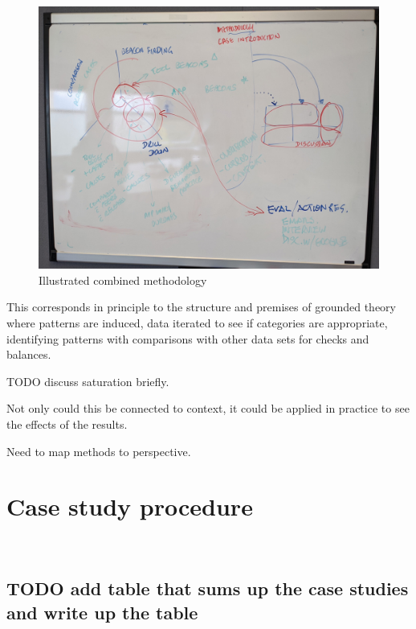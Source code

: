 \begin{figure}
    \centering
    \includegraphics[width=14cm]{images/my/illustrated-combined-methodology-v0-1.jpg}
    \caption{Illustrated combined methodology}
    \label{fig:illustrated-combined-methodology}
\end{figure}

This corresponds in principle to the structure and premises of grounded theory where patterns are induced, data iterated to see if categories are appropriate, identifying patterns with comparisons with other data sets for checks and balances. 

TODO discuss saturation briefly. 

Not only could this be connected to context, it could be applied in practice to see the effects of the results.

Need to map methods to perspective. 



\section{Case study procedure}~\label{section-case-study-procedure}

\subsection{TODO add table that sums up the case studies and write up the table}

